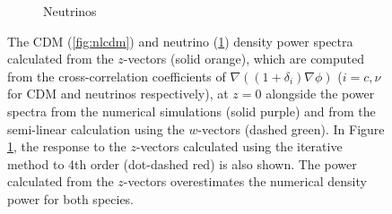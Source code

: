 \documentclass{aastex}
\begin{document}
\begin{figure}[h!]
\begin{subfigure}[t]{0.45\textwidth}
    \caption{Neutrinos}\label{fig:nlnu}
  \end{subfigure}
  \caption{The CDM (\ref{fig:nlcdm}) and neutrino
    (\ref{fig:nlnu}) density power spectra calculated from the
    $z$-vectors (solid orange), which are
    computed from the cross-correlation coefficients of $\nabla
    ((1+\delta_i) \nabla \phi)$ ($i=c,\nu$ for CDM and neutrinos
    respectively), at $z=0$ alongside the power spectra from the 
    numerical simulations 
    (solid purple) and from the semi-linear calculation using 
    the $w$-vectors (dashed
    green).  In
    Figure \ref{fig:nlnu}, the response to the $z$-vectors
    calculated using the iterative method to 4th order (dot-dashed red) is
    also shown. The power calculated from the $z$-vectors
    overestimates the numerical density power for both
    species. 
}\label{fig:nl}
\end{figure}
\end{document}
